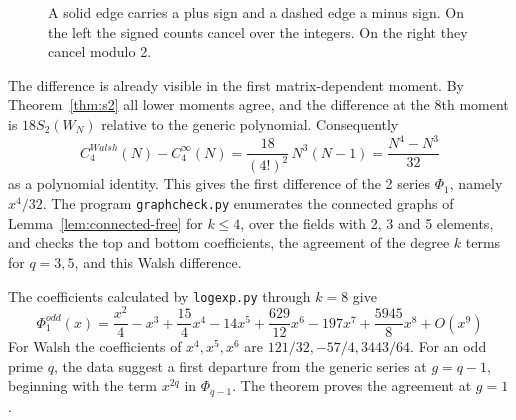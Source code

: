 \documentclass[11pt,a4paper]{article}
\theoremstyle{remark}
\begin{document}
\begin{figure}[htb!]
\centering
{}
\caption{A solid edge carries a plus sign and a dashed edge a minus sign.
On the left the signed counts cancel over the integers. On the right
they cancel modulo 2.}\label{fig:free-square}
\end{figure}

The difference is already visible in the first
matrix-dependent moment. By Theorem~\ref{thm:s2} all lower moments
agree, and the difference at the 8th moment is $18S_2(W_N)$ relative
to the generic polynomial. Consequently
\[
 C_4^{Walsh}(N)-C_4^\infty(N)
 =\frac{18}{(4!)^2}\,N^3(N-1)=\frac{N^4-N^3}{32}
\]
as a polynomial identity. This gives the first difference of the 2
series $\Phi_1$, namely $x^4/32$. The program \texttt{graphcheck.py}
enumerates the connected graphs of Lemma~\ref{lem:connected-free} for
$k\leq4$, over the fields with 2, 3 and 5 elements, and checks the top and
bottom coefficients, the agreement of the degree $k$ terms for $q=3,5$,
and this Walsh difference.

The coefficients calculated by \texttt{logexp.py} through $k=8$ give
\[
 \Phi_1^{odd}(x)=\frac{x^2}{4}-x^3+\frac{15}{4}x^4-14x^5
 +\frac{629}{12}x^6-197x^7+\frac{5945}{8}x^8+O(x^9)
\]
For Walsh the coefficients of $x^4,x^5,x^6$ are
$121/32,-57/4,3443/64$. For an odd prime $q$, the data suggest a first
departure from the generic series at $g=q-1$, beginning with the term
$x^{2q}$ in $\Phi_{q-1}$. The theorem proves the agreement at $g=1$.
\end{document}
